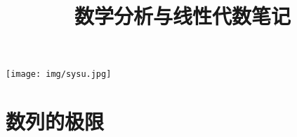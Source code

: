 \documentclass[b5paper, twoside]{article}
\title{数学分析与线性代数笔记}
\date{}
\let\oldincludegraphics\includegraphics
\renewcommand{\includegraphics}[2][]{%
  \begin{tikzpicture}
    \node[opacity=0.7] {\oldincludegraphics[#1]{#2}};
  \end{tikzpicture}%
}
\begin{document}
\begin{minipage}[t]{\textwidth}
    \vspace{-0.5cm}
    \begin{center}
        \vspace{-1.5cm} %
        \texttt{[image: img/sysu.jpg]}\\
        \vspace{-1.5cm} %
    \end{center}
    \maketitle
    \vspace{-4cm} %
\end{minipage}
\vspace{-0.8cm}

\section{数列的极限}

\tableofcontents

\label{toc}
\end{document}
